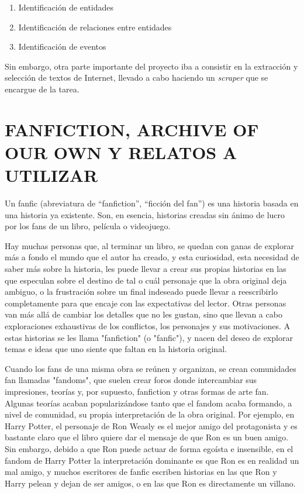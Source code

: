 \documentclass{pre-tfg}
\begin{document}
\begin{enumerate}
	\item Identificación de entidades
	\item Identificación de relaciones entre entidades
	\item Identificación de eventos
\end{enumerate}

Sin embargo, otra parte importante del proyecto iba a consistir en la extracción y selección de textos de Internet, llevado a cabo haciendo un \textit{scraper} que se encargue de la tarea.


\section{FANFICTION, ARCHIVE OF OUR OWN Y RELATOS A UTILIZAR}
Un fanfic (abreviatura de “fanfiction”, “ficción del fan”) es una historia basada en una historia ya existente. Son, en esencia, historias creadas sin ánimo de lucro por los fans de un libro, película o videojuego. 

Hay muchas personas que, al terminar un libro, se quedan con ganas de explorar más a fondo el mundo que el autor ha creado, y esta curiosidad, esta necesidad de saber más sobre la historia, les puede llevar a crear sus propias historias en las que especulan sobre el destino de tal o cuál personaje que la obra original deja ambiguo, o la frustración sobre un final indeseado puede llevar a reescribirlo completamente para que encaje con las expectativas del lector. Otras personas van más allá de cambiar los detalles que no les gustan, sino que llevan a cabo exploraciones exhaustivas de los conflictos, los personajes y sus motivaciones. A estas historias se les llama "fanfiction" (o "fanfic"), y nacen del deseo de explorar temas e ideas que uno siente que faltan en la historia original.

Cuando los fans de una misma obra se reúnen y organizan, se crean comunidades fan llamadas "fandoms", que suelen crear foros donde intercambiar sus impresiones, teorías y, por supuesto, fanfiction y otras formas de arte fan. Algunas teorías acaban popularizándose tanto que el fandom acaba formando, a nivel de comunidad, su propia interpretación de la obra original. Por ejemplo, en Harry Potter, el personaje de Ron Weasly es el mejor amigo del protagonista y es bastante claro que el libro quiere dar el mensaje de que Ron es un buen amigo. Sin embargo, debido a que Ron puede actuar de forma egoísta e insensible, en el fandom de Harry Potter la interpretación dominante es que Ron es en realidad un mal amigo, y muchos escritores de fanfic escriben historias en las que Ron y Harry pelean y dejan de ser amigos, o en las que Ron es directamente un villano.
\end{document}
